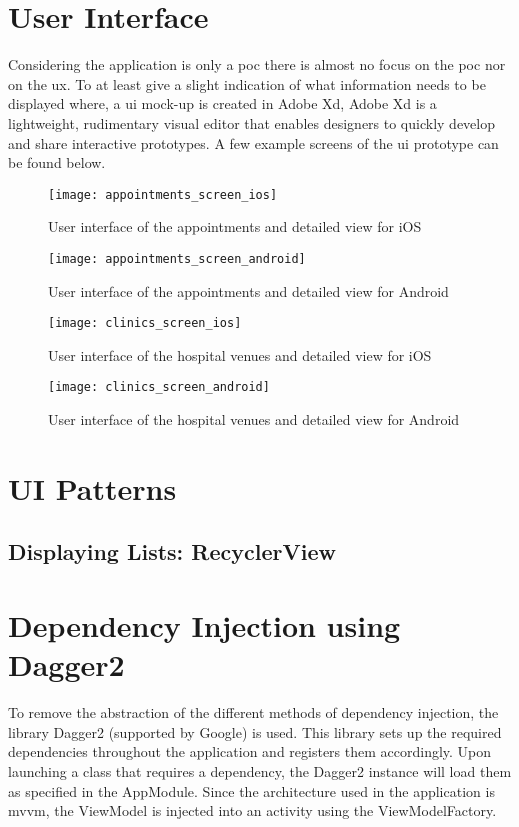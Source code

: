 \section{User Interface}
Considering the application is only a \acrshort{poc} there is almost no focus on the \acrlong{poc} nor on the \acrfull{ux}. To at least give a slight indication of what information needs to be displayed where, a \acrshort{ui} mock-up is created in Adobe Xd, Adobe Xd is a lightweight, rudimentary visual editor that enables designers to quickly develop and share interactive prototypes. A few example screens of the \acrshort{ui} prototype can be found below.
\begin{figure}[H]
\centering
\texttt{[image: appointments\_screen\_ios]}
\caption{User interface of the appointments and detailed view for iOS}
\end{figure}
\begin{figure}[H]
\centering
\texttt{[image: appointments\_screen\_android]}
\caption{User interface of the appointments and detailed view for Android}
\end{figure}
\begin{figure}[H]
\centering
\texttt{[image: clinics\_screen\_ios]}
\caption{User interface of the hospital venues and detailed view for iOS}
\end{figure}
\begin{figure}[H]
\centering
\texttt{[image: clinics\_screen\_android]}
\caption{User interface of the hospital venues and detailed view for Android}
\end{figure}
\section{UI Patterns}
\subsection{Displaying Lists: RecyclerView}
\cite{https://developer.android.com/guide/topics/ui/layout/recyclerview}
\section{Dependency Injection using Dagger2}
To remove the abstraction of the different methods of dependency injection, the library Dagger2 (supported by Google) is used. This library sets up the required dependencies throughout the application and registers them accordingly. Upon launching a class that requires a dependency, the Dagger2 instance will load them as specified in the AppModule. Since the architecture used in the application is \acrshort{mvvm}, the ViewModel is injected into an activity using the ViewModelFactory.
